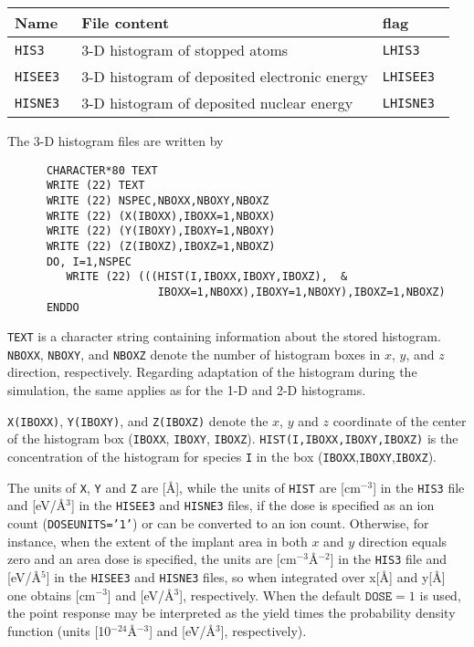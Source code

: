 \bigskip
%
\begin{center}
\begin{tabular}{|l|p{}|l|}
\hline
Name       & File content                                 & flag \\
\hline
\tt HIS3   & 3-D histogram of stopped atoms               & \tt LHIS3 \\
\tt HISEE3 & 3-D histogram of deposited electronic energy & \tt LHISEE3 \\
\tt HISNE3 & 3-D histogram of deposited nuclear energy    & \tt LHISNE3 \\
\hline
\end{tabular}
\end{center}

\bigskip

The 3-D histogram files are written by
%
\begin{verbatim}
      CHARACTER*80 TEXT
      WRITE (22) TEXT
      WRITE (22) NSPEC,NBOXX,NBOXY,NBOXZ
      WRITE (22) (X(IBOXX),IBOXX=1,NBOXX)
      WRITE (22) (Y(IBOXY),IBOXY=1,NBOXY)
      WRITE (22) (Z(IBOXZ),IBOXZ=1,NBOXZ)
      DO, I=1,NSPEC
         WRITE (22) (((HIST(I,IBOXX,IBOXY,IBOXZ),  &
                       IBOXX=1,NBOXX),IBOXY=1,NBOXY),IBOXZ=1,NBOXZ)
      ENDDO
\end{verbatim}
%
\texttt{TEXT} is a character string containing information about the stored
histogram. \texttt{NBOXX}, \texttt{NBOXY}, and \texttt{NBOXZ} denote the number
of histogram boxes in $x$, $y$, and $z$ direction, respectively. Regarding
adaptation of the histogram during the simulation, the same applies as for the
1-D and 2-D histograms. 

\texttt{X(IBOXX)}, \texttt{Y(IBOXY)}, and \texttt{Z(IBOXZ)} denote the $x$, $y$
and $z$ coordinate of the center of the histogram box (\texttt{IBOXX},
\texttt{IBOXY}, \texttt{IBOXZ}). \texttt{HIST(I,IBOXX,IBOXY,IBOXZ)} is the
concentration of the histogram for species \texttt{I} in the box
(\texttt{IBOXX},\texttt{IBOXY},\texttt{IBOXZ}).

The units of \texttt{X}, \texttt{Y} and \texttt{Z} are [\AA], while the units of   
\texttt{HIST} are [cm$^{-3}$] in the \texttt{HIS3} file and [eV/\AA$^3$] in the
\texttt{HISEE3} and \texttt{HISNE3} files, if the dose is specified as an ion
count (\texttt{DOSEUNITS='1'}) or can be converted to an ion count. Otherwise, 
for instance, when the extent of the implant area in both $x$ and $y$ direction 
equals zero and an area dose is specified, the units are [cm$^{-3}$\AA$^{-2}$]
in the \texttt{HIS3} file and [eV/\AA$^5$] in the \texttt{HISEE3} and 
\texttt{HISNE3} files, so when integrated over x[\AA] and y[\AA] one obtains
[cm$^{-3}$] and [eV/\AA$^3$], respectively. When the default
$\texttt{DOSE} = 1$ is used, the point response may be interpreted as the yield
times the probability density function (units [10$^{-24}$\AA$^{-3}$] and
[eV/\AA$^3$], respectively).
